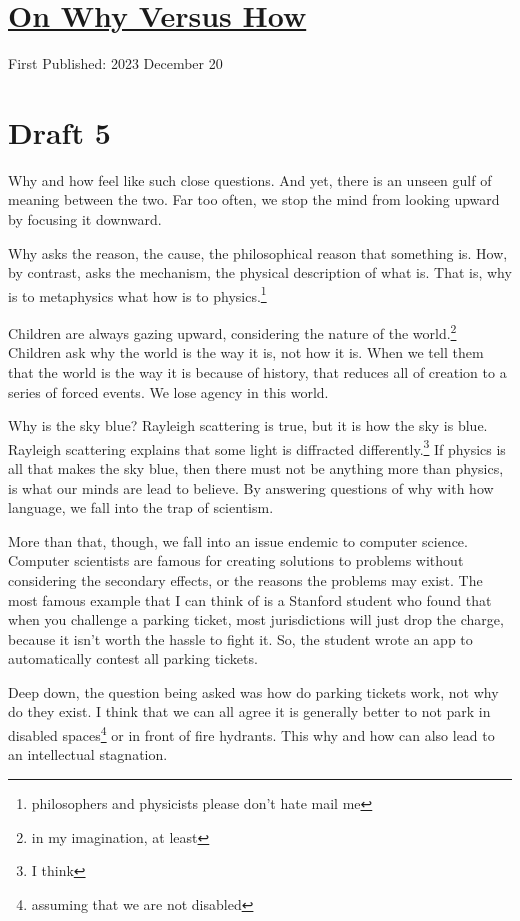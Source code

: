\documentclass[12pt]{article}[titlepage]
\renewcommand{\,}{\textsuperscript{,}}
\begin{document}
\doublespacing
\section{\href{why-versus-how.html}{On Why Versus How}}
First Published: 2023 December 20

\section{Draft 5}
Why and how feel like such close questions.
And yet, there is an unseen gulf of meaning between the two.
Far too often, we stop the mind from looking upward by focusing it downward.

Why asks the reason, the cause, the philosophical reason that something is.
How, by contrast, asks the mechanism, the physical description of what is.
That is, why is to metaphysics what how is to physics.\footnote{philosophers and physicists please don't hate mail me}

Children are always gazing upward, considering the nature of the world.\footnote{in my imagination, at least}
Children ask why the world is the way it is, not how it is.
When we tell them that the world is the way it is because of history, that reduces all of creation to a series of forced events.
We lose agency in this world.

Why is the sky blue?
Rayleigh scattering is true, but it is how the sky is blue.
Rayleigh scattering explains that some light is diffracted differently.\footnote{I think}
If physics is all that makes the sky blue, then there must not be anything more than physics, is what our minds are lead to believe.
By answering questions of why with how language, we fall into the trap of scientism.

More than that, though, we fall into an issue endemic to computer science.
Computer scientists are famous for creating solutions to problems without considering the secondary effects, or the reasons the problems may exist.
The most famous example that I can think of is a Stanford student who found that when you challenge a parking ticket, most jurisdictions will just drop the charge, because it isn't worth the hassle to fight it.
So, the student wrote an app to automatically contest all parking tickets.

Deep down, the question being asked was how do parking tickets work, not why do they exist.
I think that we can all agree it is generally better to not park in disabled spaces\footnote{assuming that we are not disabled} or in front of fire hydrants.
This why and how can also lead to an intellectual stagnation.
\end{document}
